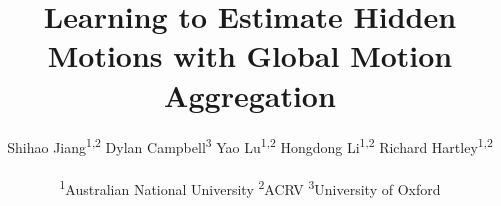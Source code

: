 \documentclass[10pt,twocolumn,letterpaper]{article}
\begin{document}
\title{Learning to Estimate Hidden Motions with Global Motion Aggregation}

\author{Shihao Jiang\textsuperscript{1,2} \qquad  
Dylan Campbell\textsuperscript{3} \qquad
Yao Lu\textsuperscript{1,2}  \qquad
Hongdong Li\textsuperscript{1,2}  \qquad 
Richard Hartley\textsuperscript{1,2}\\
\\
\textsuperscript{1}Australian National University \qquad 
\textsuperscript{2}ACRV \qquad 
\textsuperscript{3}University of Oxford
}

\newcommand\myfigure{\centering
\texttt{[image: figures/demo.pdf]}
\captionof{figure}{\textbf{Global motion aggregation helps resolve ambiguities caused by 
occlusions.}
Occlusions---a term we extend to include any parts of a scene that disappear in the next frame---cause large ambiguities in the optical flow estimation problem that cannot be resolved by local approaches. Based on the assumption that points on an object have homogeneous motions, which often holds approximately, we propose to globally aggregate motion features of pixels that are likely to belong to the same object.
In this example, most pixels on the blade move out-of-frame from frame 2 to frame 3. When only these two frames are provided, global aggregation allows motion information to be passed from non-occluded pixels to occluded pixels, which helps resolve ambiguities caused by occlusions.
}
\label{fig:demo}
}

\maketitle
\ificcvfinal\thispagestyle{empty}\fi
\end{document}
